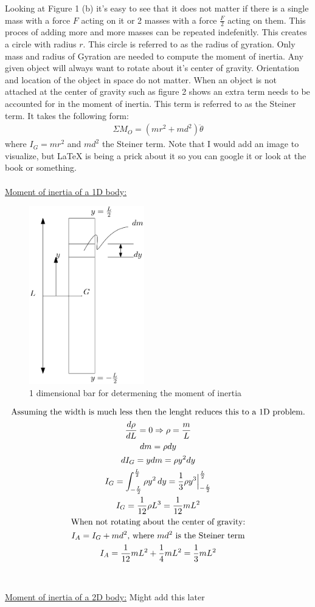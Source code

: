 \documentclass[11pt, a4paper]{article}
\begin{document}
Looking at Figure 1 (b) it's easy to see that it does not matter if there is a single mass with a force $F$
acting on it or 2 masses with a force $\frac{F}{2}$ acting on them. This proces of adding more and more masses
can be repeated indefenitly. This creates a circle with radius $r$. This circle is referred to as the 
radius of gyration. Only mass and radius of Gyration are needed to compute the moment of inertia.
Any given object will always want to rotate about it's center of gravity. Orientation and location
of the object in space do not matter. When an object is not attached at the center of gravity such as
figure 2 shows an extra term needs to be accounted for in the moment of inertia. This term is referred to
as the Steiner term. It takes the following form:
\begin{gather}
  \Sigma M_O = (mr^2 + md^2)\ddot{\theta}
\end{gather}
where $I_G = mr^2$ and $md^2$ the Steiner term. Note that I would add an image to visualize, but LaTeX is being a 
prick about it so you can google it or look at the book or something.\\
\\
\newpage
\underline{Moment of inertia of a 1D body:}
\begin{figure}[h!]
  \centerline{\includegraphics[width=50mm]{images/1D.png}}
  \caption{1 dimensional bar for determening the moment of inertia}
\end{figure}
\begin{gather}
  \text{Assuming the width is much less then the lenght reduces this to a 1D problem.}\notag\\
  \frac{d\rho}{dL} = 0 \Rightarrow \rho = \frac{m}{L}\\
  dm = \rho dy\\
  dI_G = ydm = \rho y^2 dy\\
  I_G = \int_{-\frac{L}{2}}^{\frac{L}{2}} \rho y^2\,dy = \frac{1}{3}\rho y^3\Big|_{-\frac{L}{2}}^{\frac{L}{2}}\\
  I_G = \frac{1}{12}\rho L^3 = \frac{1}{12}mL^2\\
  \text{When not rotating about the center of gravity:}\notag\\
  I_A = I_G + md^2\text{, where $md^2$ is the Steiner term}\\
  I_A = \frac{1}{12}mL^2 + \frac{1}{4}mL^2 = \frac{1}{3}mL^2
\end{gather}\\
\\
\underline{Moment of inertia of a 2D body:}
Might add this later
\end{document}
